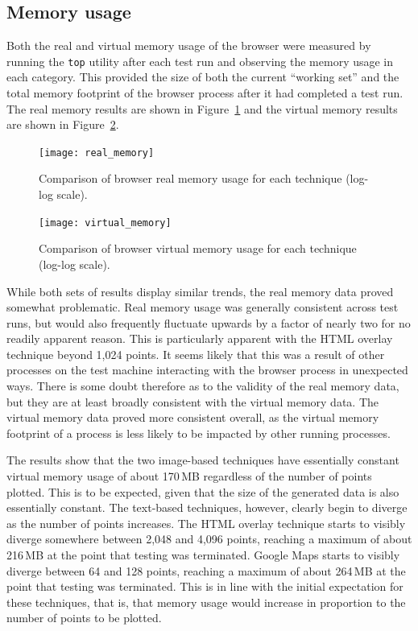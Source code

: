 \documentclass[acmnow]{acmtrans2m}
\begin{document}
\subsection{Memory usage}

Both the real and virtual memory usage of the browser were measured by
running the \texttt{top} utility after each test run and observing the
memory usage in each category. This provided the size of both the
current ``working set'' and the total memory footprint of the browser
process after it had completed a test run. The real memory results are
shown in Figure~\ref{fig-real-memory} and the virtual memory results are
shown in Figure~\ref{fig-virtual-memory}.


\begin{figure}
	\centering
	\texttt{[image: real\_memory]}
	\caption{Comparison of browser real memory usage for each technique
	(log-log scale).}
	\label{fig-real-memory}
\end{figure}


\begin{figure}
	\centering
	\texttt{[image: virtual\_memory]}
	\caption{Comparison of browser virtual memory usage for each
	technique (log-log scale).}
	\label{fig-virtual-memory}
\end{figure}


While both sets of results display similar trends, the real memory data
proved somewhat problematic. Real memory usage was generally consistent
across test runs, but would also frequently fluctuate upwards by a
factor of nearly two for no readily apparent reason. This is
particularly apparent with the HTML overlay technique beyond 1,024
points. It seems likely that this was a result of other processes on the
test machine interacting with the browser process in unexpected ways.
There is some doubt therefore as to the validity of the real memory
data, but they are at least broadly consistent with the virtual memory
data. The virtual memory data proved more consistent overall, as the
virtual memory footprint of a process is less likely to be impacted by
other running processes.

The results show that the two image-based techniques have essentially
constant virtual memory usage of about 170\,MB regardless of the number
of points plotted. This is to be expected, given that the size of the
generated data is also essentially constant. The text-based techniques,
however, clearly begin to diverge as the number of points increases. The
HTML overlay technique starts to visibly diverge somewhere between 2,048
and 4,096 points, reaching a maximum of about 216\,MB at the point that
testing was terminated. Google Maps starts to visibly diverge between 64
and 128 points, reaching a maximum of about 264\,MB at the point that
testing was terminated. This is in line with the initial expectation for
these techniques, that is, that memory usage would increase in
proportion to the number of points to be plotted.
\end{document}
